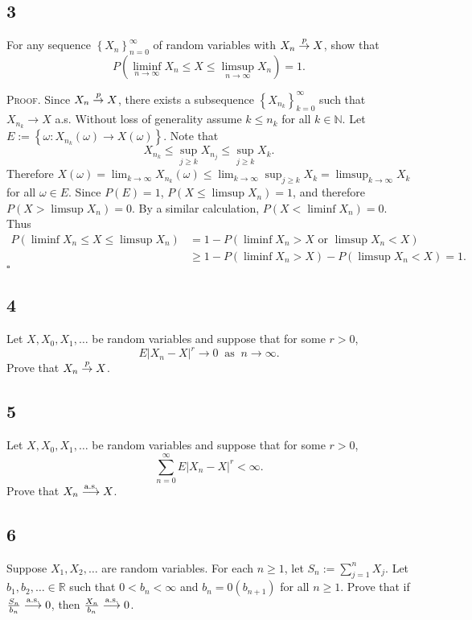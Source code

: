 \documentclass[12pt]{article}
\newcounter{ProofCounter}
\newenvironment{Proof}{\stepcounter{ProofCounter}\textsc{Proof.}}{\hfill$\square$}
\begin{document}
\subsection*{3}
\begin{tcolorbox}
For any sequence $\left\{ X_{n} \right\}_{n=0}^{\infty}$ of random variables with $X_{n}\stackrel{p}{\rightarrow} X$, show that 
\[ P\left(\liminf_{n\rightarrow\infty}X_{n}\leq X\leq \limsup_{n\rightarrow\infty}X_{n}\right) = 1. \]
\end{tcolorbox}
\begin{Proof}
Since $X_{n} \stackrel{p}{\rightarrow} X$, there exists a subsequence $\left\{ X_{n_{k}} \right\}_{k=0}^{\infty}$ such that $X_{n_{k}}\rightarrow X$ a.s. 
Without loss of generality assume $k\leq n_{k}$ for all $k \in \mathbb{N}$.
Let $E := \left\{ \omega : X_{n_{k}}(\omega) \rightarrow X(\omega) \right\}$. Note that
\[ X_{n_{k}} \leq \sup_{j\geq k}X_{n_{j}} \leq \sup_{j\geq k}X_{k}. \]
Therefore $X(\omega) = \lim_{k\rightarrow\infty}X_{n_{k}}(\omega) \leq \lim_{k\rightarrow\infty}\sup_{j\geq k}X_{k} =
\limsup_{k\rightarrow\infty}X_{k}$ for all $\omega \in E$. Since $P(E) = 1$, $P(X \leq \limsup X_{n}) = 1$, and therefore $P(X > \limsup X_{n}) = 0$.
By a similar calculation, $P(X < \liminf X_{n}) = 0$. Thus 
\begin{align*}
P(\liminf X_{n} \leq X \leq \limsup X_{n}) & = 1 - P(\liminf X_{n} > X \text{ or } \limsup X_{n} < X) \\
& \geq 1 - P(\liminf X_{n} > X) - P(\limsup X_{n}
< X) = 1. 
\end{align*}
\end{Proof}

\subsection*{4}
\begin{tcolorbox}
Let $X, X_{0}, X_{1}, \hdots$ be random variables and suppose that for some $r > 0$,
\[ E|X_{n} - X|^{r} \rightarrow 0 \ \text{ as } \ n \rightarrow \infty. \]
Prove that $X_{n}\stackrel{p}{\rightarrow} X$.
\end{tcolorbox}

\subsection*{5}
\begin{tcolorbox}
Let $X, X_{0}, X_{1}, \hdots$ be random variables and suppose that for some $r > 0$,
\[ \sum_{n=0}^{\infty}E|X_{n} - X|^{r} < \infty. \]
Prove that $X_{n} \stackrel{\text{a.s.}}{\longrightarrow} X$.
\end{tcolorbox}

\subsection*{6}
\begin{tcolorbox}
Suppose $X_{1}, X_{2}, \hdots$ are random variables. For each $n \geq 1$, let $S_{n} := \sum_{j=1}^{n}X_{j}$. Let $b_{1}, b_{2}, \hdots \in
\mathbb{R}$ such that $0 < b_{n} < \infty$ and $b_{n} = \mathcal{0}(b_{n+1})$ for all $n \geq 1$. Prove that if 
$\frac{S_{n}}{b_{n}} \stackrel{\text{a.s.}}{\longrightarrow} 0$, then $\frac{X_{n}}{b_{n}} \stackrel{\text{a.s.}}{\longrightarrow} 0$.
\end{tcolorbox}
\end{document}

